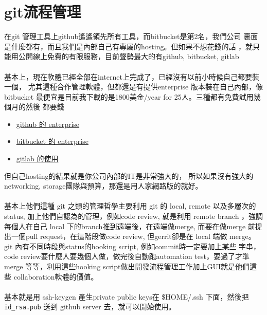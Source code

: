 \section{git流程管理}
  在git 管理工具上github遙遙領先所有工具，而bitbucket是第2名，我們公司
  裏面是什麼都有，而且我們是內部自己有專屬的hosting。但如果不想花錢的話
  ，就只能用公開線上免費的有限服務，目前聲勢最大的有github, bitbucket, gitlab
  \\\\
  基本上，現在軟體已經全部在internet上完成了，已經沒有以前小時候自己都要裝一個，
  尤其這種合作管理軟體，但都還是有提供enterprise 版本裝在自己內部，像 bitbucket
  最便宜是目前我下載的是1800美金/year for 25人。三種都有免費試用幾個月的然後
  都要錢
  \begin{itemize}
    \item \href{https://enterprise.github.com/home}{github 的 enterprise}
    \item \href{https://bitbucket.org/product/enterprise}{bitbucket 的 enterprise}
    \item \href{https://about.gitlab.com}{gitlab 的使用}
  \end{itemize}
  但自己hosting的結果就是你公司內部的IT是非常強大的，
  所以如果沒有強大的networking, storage團隊與預算，那還是用人家網路版的就好。
  \\\\
  基本上他們這種 git 之類的管理哲學主要利用 git 的 local, remote 以及多層次的
  status, 加上他們自認為的管理，例如code review, 就是利用 remote branch
  ，強調每個人在自己 local 下的branch推到遠端後，在遠端做merge, 而要在做merge
  前提出一個pull request，在這階段做code review, 但gerrit卻是在 local 端做
  merge。git 內有不同時段與status的hooking script, 例如commit時一定要加上某些
  字串，code review要什麼人要幾個人做，做完後自動跑automation test，要過了才準
  merge 等等，利用這些hooking script做出開發流程管理工作加上GUI就是他們這些
  collaboration軟體的價值。
  \\\\
  基本就是用 ssh-keygen 產生private public keys在 \$HOME/.ssh 下面，然後把
  \verb=id_rsa.pub= 送到 github server 去，就可以開始使用。
